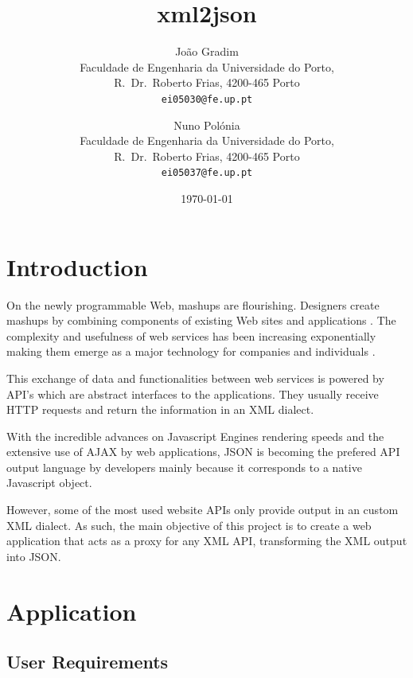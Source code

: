 \documentclass[twocolumn,twoside,10pt,a4paper]{article}
\title{xml2json}
\author{João Gradim\\
\small Faculdade de Engenharia da Universidade do Porto,\\[-0.8ex]
\small R.\ Dr.\ Roberto Frias, 4200-465 Porto\\[-0.8ex]
\small \texttt{ei05030@fe.up.pt}\\
\and
Nuno Polónia\\
\small Faculdade de Engenharia da Universidade do Porto,\\[-0.8ex]
\small R.\ Dr.\ Roberto Frias, 4200-465 Porto\\[-0.8ex]
\small \texttt{ei05037@fe.up.pt}
}
\date{\today}
\begin{document}
\maketitle
\thispagestyle{plain}

\begin{abstract}

\end{abstract}

\section{Introduction}\label{sec:intro}
On the newly programmable Web, mashups are flourishing. Designers create mashups by combining components of existing Web sites and applications \cite{maximilien}. The complexity and usefulness of web services has been increasing exponentially making them emerge as a major technology for companies and individuals \cite{benslimane}.

This exchange of data and functionalities between web services is powered by API's which are abstract interfaces to the applications. They usually receive HTTP requests and return the information in an XML dialect.

With the incredible advances on Javascript Engines rendering speeds and the extensive use of AJAX by web applications, JSON is becoming the prefered API output language by developers mainly because it corresponds to a native Javascript object.

However, some of the most used website APIs only provide output in an custom XML dialect. As such, the main objective of this project is to create a web application that acts as a proxy for any XML API, transforming the XML output into JSON.

\section{Application}\label{sec:application}


\subsection{User Requirements}\label{sec:user-requirements}
\end{document}
